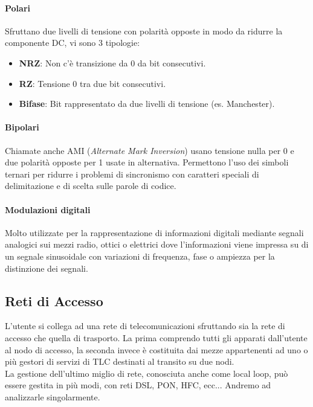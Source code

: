 \documentclass[12pt]{article}
\begin{document}
\paragraph{Polari}
Sfruttano due livelli di tensione con polarità opposte in modo da ridurre la componente DC, vi sono 3 tipologie:
\begin{itemize}
  \item \textbf{NRZ}: Non c'è transizione da 0 da bit consecutivi.
  \item \textbf{RZ}: Tensione 0 tra due bit consecutivi.
  \item \textbf{Bifase}: Bit rappresentato da due livelli di tensione (es. Manchester).
\end{itemize}

\paragraph{Bipolari}
Chiamate anche AMI (\textit{Alternate Mark Inversion}) usano tensione nulla per 0 e due polarità opposte per 1 usate in alternativa. Permettono l'uso dei simboli ternari per ridurre i problemi di sincronismo con caratteri speciali di delimitazione e di scelta sulle parole di codice.

\paragraph{Modulazioni digitali}
Molto utilizzate per la rappresentazione di informazioni digitali mediante segnali analogici sui mezzi radio, ottici o elettrici dove l'informazioni viene impressa su di un segnale sinusoidale con variazioni di frequenza, fase o ampiezza per la distinzione dei segnali. %

\subsection{Reti di Accesso}
L'utente si collega ad una rete di telecomunicazioni sfruttando sia la rete di accesso che quella di trasporto. La prima comprendo tutti gli apparati dall'utente al nodo di accesso, la seconda invece è costituita dai mezze appartenenti ad uno o più gestori di servizi di TLC destinati al transito su due nodi.\\
La gestione dell'ultimo miglio di rete, conosciuta anche come local loop, può essere gestita in più modi, con reti DSL, PON, HFC, ecc... Andremo ad analizzarle singolarmente.
\end{document}
